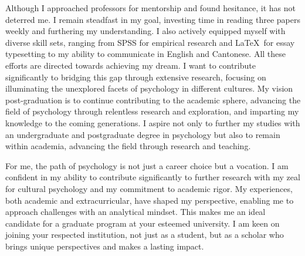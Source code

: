 \documentclass[]{article}
\begin{document}

Although I approached professors for mentorship and found hesitance, it has not deterred me.
I remain steadfast in my goal, investing time in reading three papers weekly and furthering my understanding.
I also actively equipped myself with diverse skill sets, ranging from SPSS for empirical research and \LaTeX\ for essay typesetting to my ability to communicate in English and Cantonese.
All these efforts are directed towards achieving my dream.
I want to contribute significantly to bridging this gap through extensive research, focusing on illuminating the unexplored facets of psychology in different cultures.
My vision post-graduation is to continue contributing to the academic sphere, advancing the field of psychology through relentless research and exploration, and imparting my knowledge to the coming generations.
I aspire not only to further my studies with an undergraduate and postgraduate degree in psychology but also to remain within academia, advancing the field through research and teaching.


For me, the path of psychology is not just a career choice but a vocation. I am confident in my ability to contribute significantly to further research with my zeal for cultural psychology and my commitment to academic rigor.
My experiences, both academic and extracurricular, have shaped my perspective, enabling me to approach challenges with an analytical mindset. This makes me an ideal candidate for a graduate program at your esteemed university.
I am keen on joining your respected institution, not just as a student, but as a scholar who brings unique perspectives and makes a lasting impact.
\end{document}
